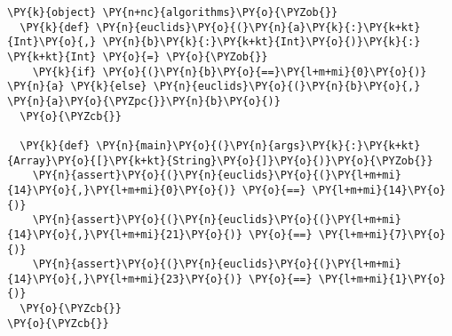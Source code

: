 \begin{Verbatim}[commandchars=\\\{\}]
\PY{k}{object} \PY{n+nc}{algorithms}\PY{o}{\PYZob{}}
  \PY{k}{def} \PY{n}{euclids}\PY{o}{(}\PY{n}{a}\PY{k}{:}\PY{k+kt}{Int}\PY{o}{,} \PY{n}{b}\PY{k}{:}\PY{k+kt}{Int}\PY{o}{)}\PY{k}{:} \PY{k+kt}{Int} \PY{o}{=} \PY{o}{\PYZob{}}
    \PY{k}{if} \PY{o}{(}\PY{n}{b}\PY{o}{==}\PY{l+m+mi}{0}\PY{o}{)} \PY{n}{a} \PY{k}{else} \PY{n}{euclids}\PY{o}{(}\PY{n}{b}\PY{o}{,} \PY{n}{a}\PY{o}{\PYZpc{}}\PY{n}{b}\PY{o}{)}
  \PY{o}{\PYZcb{}}

  \PY{k}{def} \PY{n}{main}\PY{o}{(}\PY{n}{args}\PY{k}{:}\PY{k+kt}{Array}\PY{o}{[}\PY{k+kt}{String}\PY{o}{]}\PY{o}{)}\PY{o}{\PYZob{}}
    \PY{n}{assert}\PY{o}{(}\PY{n}{euclids}\PY{o}{(}\PY{l+m+mi}{14}\PY{o}{,}\PY{l+m+mi}{0}\PY{o}{)} \PY{o}{==} \PY{l+m+mi}{14}\PY{o}{)}
    \PY{n}{assert}\PY{o}{(}\PY{n}{euclids}\PY{o}{(}\PY{l+m+mi}{14}\PY{o}{,}\PY{l+m+mi}{21}\PY{o}{)} \PY{o}{==} \PY{l+m+mi}{7}\PY{o}{)}
    \PY{n}{assert}\PY{o}{(}\PY{n}{euclids}\PY{o}{(}\PY{l+m+mi}{14}\PY{o}{,}\PY{l+m+mi}{23}\PY{o}{)} \PY{o}{==} \PY{l+m+mi}{1}\PY{o}{)}
  \PY{o}{\PYZcb{}}
\PY{o}{\PYZcb{}}
\end{Verbatim}
